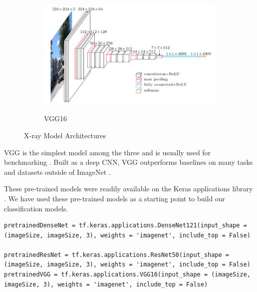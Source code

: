\begin{figure}[H]\ContinuedFloat
          \begin{center}
        \begin{subfigure}[]{0.7\linewidth}
                \includegraphics[height=6cm, width=\linewidth]{Images/VGG16.png}
                \caption{VGG16 \cite{VGG}}
                \label{fig:VGG}
        \end{subfigure}%
    
        \end{center}
        \caption{X-ray Model Architectures}\label{fig:arch}


\end{figure}
\vspace{-2em}
VGG is the simplest model among the three and is usually used for benchmarking \cite{SKZ2015}. Built as a deep CNN, VGG outperforms baselines on many tasks and datasets outside of ImageNet \cite{WJY2019}.

These pre-trained models were readily available on the Keras applications library \cite{KAP}. We have used these pre-trained models as a starting point to build our classification models.

\vspace{1em}

\begin{lstlisting}
pretrainedDenseNet = tf.keras.applications.DenseNet121(input_shape = (imageSize, imageSize, 3), weights = 'imagenet', include_top = False)

pretrainedResNet = tf.keras.applications.ResNet50(input_shape = (imageSize, imageSize, 3), weights = 'imagenet', include_top = False)
pretrainedVGG = tf.keras.applications.VGG16(input_shape = (imageSize, imageSize, 3), weights = 'imagenet', include_top = False)
\end{lstlisting}




